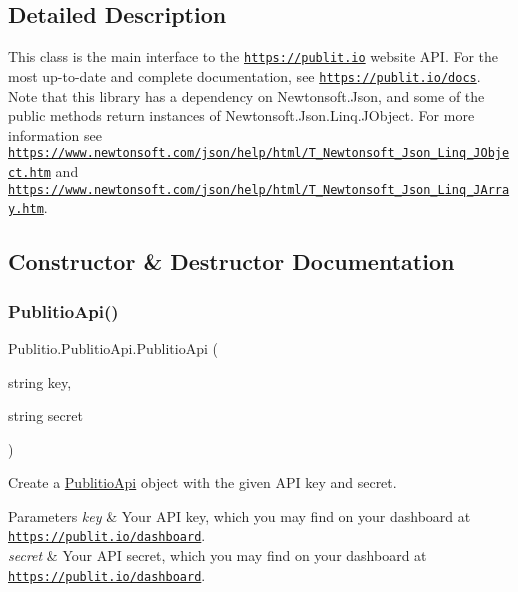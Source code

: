 \subsection{Detailed Description}
This class is the main interface to the \href{https://publit.io}{\tt https\+://publit.\+io} website A\+PI. For the most up-\/to-\/date and complete documentation, see \href{https://publit.io/docs}{\tt https\+://publit.\+io/docs}. Note that this library has a dependency on {\ttfamily Newtonsoft.\+Json}, and some of the public methods return instances of {\ttfamily Newtonsoft.\+Json.\+Linq.\+J\+Object}. For more information see \href{https://www.newtonsoft.com/json/help/html/T_Newtonsoft_Json_Linq_JObject.htm}{\tt https\+://www.\+newtonsoft.\+com/json/help/html/\+T\+\_\+\+Newtonsoft\+\_\+\+Json\+\_\+\+Linq\+\_\+\+J\+Object.\+htm} and \href{https://www.newtonsoft.com/json/help/html/T_Newtonsoft_Json_Linq_JArray.htm}{\tt https\+://www.\+newtonsoft.\+com/json/help/html/\+T\+\_\+\+Newtonsoft\+\_\+\+Json\+\_\+\+Linq\+\_\+\+J\+Array.\+htm}.

\subsection{Constructor \& Destructor Documentation}
\mbox{\label{classPublitio_1_1PublitioApi_a811c5cc6ed896f6dc67ed978778f96c0}} 
\subsubsection{\texorpdfstring{Publitio\+Api()}{PublitioApi()}}
{\footnotesize\ttfamily Publitio.\+Publitio\+Api.\+Publitio\+Api (\begin{DoxyParamCaption}\item[{string}]{key,  }\item[{string}]{secret }\end{DoxyParamCaption})\hspace{0.3cm}{\ttfamily [inline]}}



Create a \hyperlink{classPublitio_1_1PublitioApi}{Publitio\+Api} object with the given A\+PI key and secret.


\begin{DoxyParams}{Parameters}
{\em key} & Your A\+PI key, which you may find on your dashboard at \href{https://publit.io/dashboard}{\tt https\+://publit.\+io/dashboard}.\\
\hline
{\em secret} & Your A\+PI secret, which you may find on your dashboard at \href{https://publit.io/dashboard}{\tt https\+://publit.\+io/dashboard}.\\
\hline
\end{DoxyParams}


